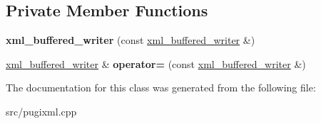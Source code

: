 \subsection*{Private Member Functions}
\begin{DoxyCompactItemize}
\item 
\mbox{\label{classxml__buffered__writer_a6ab927cae021733a4b2e9e7cbbb79c13}} 
{\bfseries xml\+\_\+buffered\+\_\+writer} (const \hyperlink{classxml__buffered__writer}{xml\+\_\+buffered\+\_\+writer} \&)
\item 
\mbox{\label{classxml__buffered__writer_a0aab8cdf0db6269840a0b16319bdb985}} 
\hyperlink{classxml__buffered__writer}{xml\+\_\+buffered\+\_\+writer} \& {\bfseries operator=} (const \hyperlink{classxml__buffered__writer}{xml\+\_\+buffered\+\_\+writer} \&)
\end{DoxyCompactItemize}


The documentation for this class was generated from the following file\+:\begin{DoxyCompactItemize}
\item 
src/pugixml.\+cpp\end{DoxyCompactItemize}
